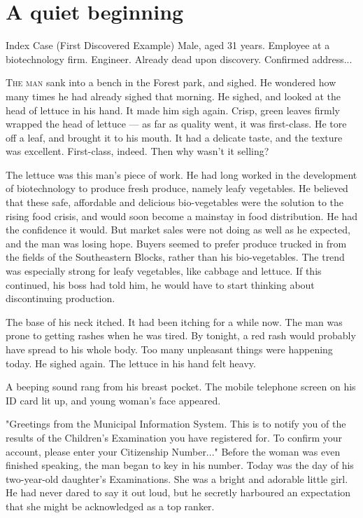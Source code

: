 
\chapter{A quiet beginning}

\begin{boxed}{Index Case (First Discovered Example)}
	Male, aged 31 years. Employee at a biotechnology firm. Engineer. Already
	dead upon discovery. Confirmed address...
\end{boxed}

\lettrine{T}{he man} sank into a bench in the Forest park, and sighed. He wondered
how many times he had already sighed that morning. He sighed, and looked
at the head of lettuce in his hand. It made him sigh again. Crisp, green
leaves firmly wrapped the head of lettuce --- as far as quality went, it
was first-class. He tore off a leaf, and brought it to his mouth. It had
a delicate taste, and the texture was excellent. First-class, indeed.
Then why wasn't it selling?

The lettuce was this man's piece of work. He had long worked in the
development of biotechnology to produce fresh produce, namely leafy
vegetables. He believed that these safe, affordable and delicious
bio-vegetables were the solution to the rising food crisis, and would
soon become a mainstay in food distribution. He had the confidence it
would. But market sales were not doing as well as he expected, and the
man was losing hope. Buyers seemed to prefer produce trucked in from the
fields of the Southeastern Blocks, rather than his bio-vegetables. The
trend was especially strong for leafy vegetables, like cabbage and
lettuce. If this continued, his boss had told him, he would have to
start thinking about discontinuing production.

The base of his neck itched. It had been itching for a while now. The
man was prone to getting rashes when he was tired. By tonight, a red
rash would probably have spread to his whole body. Too many unpleasant
things were happening today. He sighed again. The lettuce in his hand
felt heavy.

A beeping sound rang from his breast pocket. The mobile telephone screen
on his ID card lit up, and young woman's face appeared.

"Greetings from the Municipal Information System. This is to notify you
of the results of the Children's Examination you have registered for. To
confirm your account, please enter your Citizenship Number..." Before
the woman was even finished speaking, the man began to key in his
number. Today was the day of his two-year-old daughter's Examinations.
She was a bright and adorable little girl. He had never dared to say it
out loud, but he secretly harboured an expectation that she might be
acknowledged as a top ranker.

